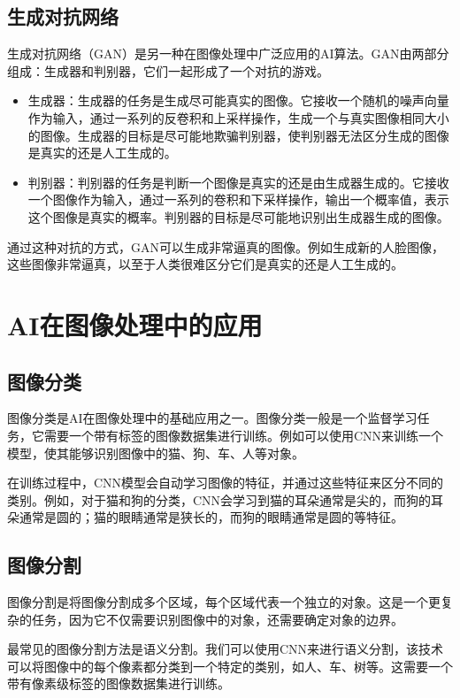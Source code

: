 \documentclass{article}
\begin{document}
\subsection{生成对抗网络}

生成对抗网络（GAN）是另一种在图像处理中广泛应用的AI算法。GAN由两部分组成：生成器和判别器，它们一起形成了一个对抗的游戏。

\begin{itemize}
    \item 生成器：生成器的任务是生成尽可能真实的图像。它接收一个随机的噪声向量作为输入，通过一系列的反卷积和上采样操作，生成一个与真实图像相同大小的图像。生成器的目标是尽可能地欺骗判别器，使判别器无法区分生成的图像是真实的还是人工生成的。
    \item 判别器：判别器的任务是判断一个图像是真实的还是由生成器生成的。它接收一个图像作为输入，通过一系列的卷积和下采样操作，输出一个概率值，表示这个图像是真实的概率。判别器的目标是尽可能地识别出生成器生成的图像。
\end{itemize}

通过这种对抗的方式，GAN可以生成非常逼真的图像。例如生成新的人脸图像，这些图像非常逼真，以至于人类很难区分它们是真实的还是人工生成的。

\section{AI在图像处理中的应用}

\subsection{图像分类}

图像分类是AI在图像处理中的基础应用之一。图像分类一般是一个监督学习任务，它需要一个带有标签的图像数据集进行训练。例如可以使用CNN来训练一个模型，使其能够识别图像中的猫、狗、车、人等对象。

在训练过程中，CNN模型会自动学习图像的特征，并通过这些特征来区分不同的类别。例如，对于猫和狗的分类，CNN会学习到猫的耳朵通常是尖的，而狗的耳朵通常是圆的；猫的眼睛通常是狭长的，而狗的眼睛通常是圆的等特征。

\subsection{图像分割}

图像分割是将图像分割成多个区域，每个区域代表一个独立的对象。这是一个更复杂的任务，因为它不仅需要识别图像中的对象，还需要确定对象的边界。

最常见的图像分割方法是语义分割。我们可以使用CNN来进行语义分割，该技术可以将图像中的每个像素都分类到一个特定的类别，如人、车、树等。这需要一个带有像素级标签的图像数据集进行训练。
\end{document}
